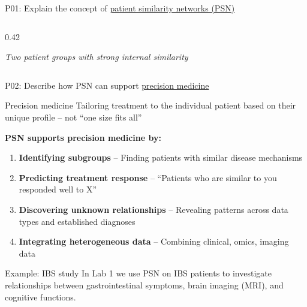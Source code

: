 \documentclass[aspectratio=169, 10pt]{beamer}
\begin{document}
\begin{frame}{P01: Explain the concept of \href{https://en.wikipedia.org/wiki/Patient_similarity_network}{patient similarity networks (PSN)}}
\begin{columns}[T]
\begin{column}{0.42\textwidth}
            
            \vspace{0.3cm}
            \footnotesize\textit{Two patient groups with strong internal similarity}
        \end{column}
    \end{columns}
\end{frame}

\begin{frame}{P02: Describe how PSN can support \href{https://en.wikipedia.org/wiki/Precision_medicine}{precision medicine}}
    \begin{block}{Precision medicine}
        Tailoring treatment to the individual patient based on their unique profile -- not ``one size fits all''
    \end{block}
    
    \vspace{0.3cm}
    \textbf{PSN supports precision medicine by:}
    \begin{enumerate}
        \item \textbf{Identifying subgroups} -- Finding patients with similar disease mechanisms
        \item \textbf{Predicting treatment response} -- ``Patients who are similar to you responded well to X''
        \item \textbf{Discovering unknown relationships} -- Revealing patterns across data types and established diagnoses
        \item \textbf{Integrating heterogeneous data} -- Combining clinical, omics, imaging data
    \end{enumerate}
    
    \vspace{0.3cm}
    \begin{alertblock}{Example: IBS study}
        In Lab 1 we use PSN on IBS patients to investigate relationships between gastrointestinal symptoms, brain imaging (MRI), and cognitive functions.
    \end{alertblock}
\end{frame}

\end{document}
